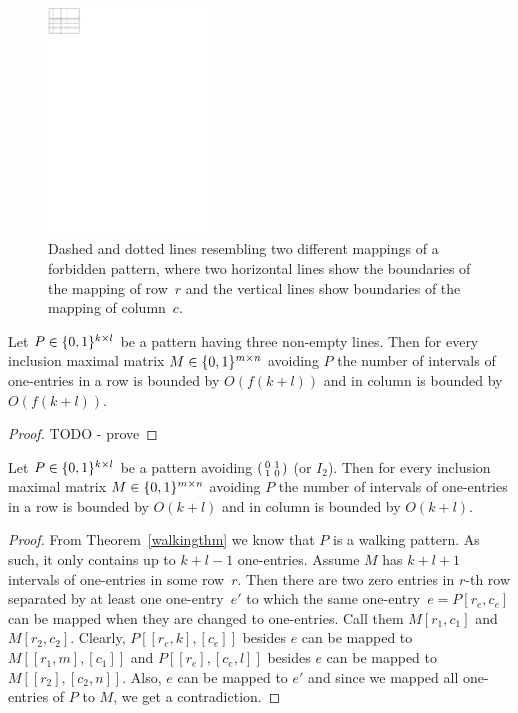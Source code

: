 \begin{figure}[h!]
\centering
\includegraphics[height=60mm]{img/twolines.pdf}
\caption{Dashed and dotted lines resembling two different mappings of a forbidden pattern, where two horizontal lines show the boundaries of the mapping of row~$r$ and the vertical lines show boundaries of the mapping of column~$c$.}
\label{twolines}
\end{figure}
\begin{lemma}
Let $P\in\{0,1\}^{k\times l}$ be a pattern having three non-empty lines. Then for every inclusion maximal matrix $M\in\{0,1\}^{m\times n}$ avoiding $P$ the number of intervals of one-entries in a row is bounded by $O(f(k+l))$ and in column is bounded by $O(f(k+l))$. 
\end{lemma}
\begin{proof}
TODO - prove
\end{proof}
\begin{lemma}
Let $P\in\{0,1\}^{k\times l}$ be a pattern avoiding $\left(\begin{smallmatrix}0&1\\1&0\end{smallmatrix}\right)$ (or $I_2$). Then for every inclusion maximal matrix $M\in\{0,1\}^{m\times n}$ avoiding $P$ the number of intervals of one-entries in a row is bounded by $O(k+l)$ and in column is bounded by $O(k+l)$. 
\end{lemma}
\begin{proof}
From Theorem~\ref{walkingthm} we know that $P$ is a walking pattern. As such, it only contains up to $k+l-1$ one-entries. Assume $M$ has $k+l+1$ intervals of one-entries in some row~$r$. Then there are two zero entries in $r$-th row separated by at least one one-entry~$e'$ to which the same one-entry~$e=P[r_e,c_e]$ can be mapped when they are changed to one-entries. Call them $M[r_1,c_1]$ and $M[r_2,c_2]$. Clearly, $P[[r_e,k],[c_e]]$ besides $e$ can be mapped to $M[[r_1,m],[c_1]]$ and $P[[r_e],[c_e,l]]$ besides $e$ can be mapped to $M[[r_2],[c_2,n]]$. Also, $e$ can be mapped to $e'$ and since we mapped all one-entries of $P$ to $M$, we get a contradiction.
\end{proof}


